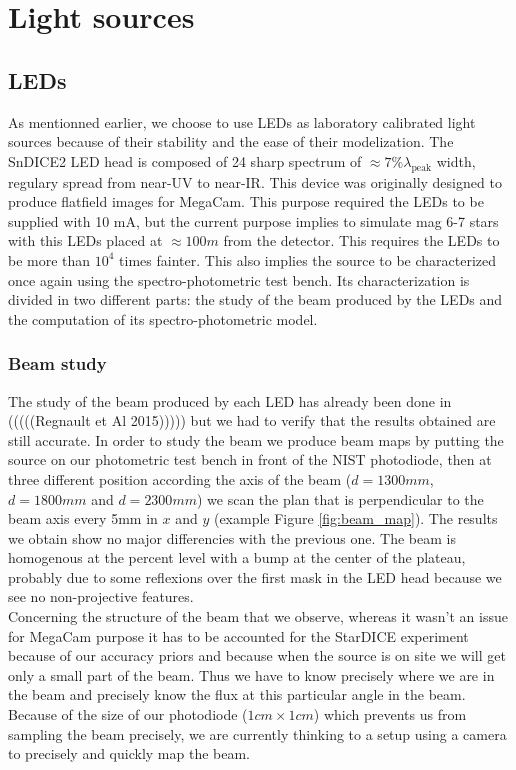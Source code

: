 \documentclass[\docopts]{\docclass}
\begin{document}

\section{Light sources}
\label{sec:sources}

\subsection{LEDs}
\label{sec:leds}
As mentionned earlier, we choose to use LEDs as laboratory calibrated
light sources because of their stability and the ease of their
modelization. The SnDICE2 LED head is composed of 24 sharp spectrum of
$\approx 7\% \lambda_\text{peak}$ width, regulary spread from near-UV to
near-IR. This device was originally designed to produce flatfield
images for MegaCam. This purpose required the LEDs to be supplied with
10 mA, but the current purpose implies to simulate mag 6-7 stars with
this LEDs placed at $\approx 100 m$ from the detector. This requires
the LEDs to be more than $10^4$ times fainter. This also implies the
source to be characterized once again using the spectro-photometric
test bench. Its characterization is divided in two different parts:
the study of the beam produced by the LEDs and the computation of its
spectro-photometric model.

\subsubsection{Beam study}
\label{sec:beam_study}
The study of the beam produced by each LED has already been done in
(((((Regnault et Al 2015)))))\cite{2015A&A...581A..45R,} but we had to
verify that the results obtained are still accurate. In order to study
the beam we produce beam maps by putting the source on our photometric
test bench in front of the NIST photodiode, then at three different
position according the axis of the beam ($d=1300mm$, $d=1800mm $ and
$d=2300mm$) we scan the plan that is perpendicular to the beam axis
every 5mm in $x$ and $y$ (example Figure \ref{fig:beam_map}). The
results we obtain show no major differencies with the previous
one. The beam is homogenous at the percent level with a bump at the
center of the plateau, probably due to some reflexions over the first
mask in the LED head because we see
no non-projective features. \\
Concerning the structure of the beam that we observe, whereas it
wasn't an issue for MegaCam purpose it has to be accounted for the
StarDICE experiment because of our accuracy priors and because when
the source is on site we will get only a small part of the beam. Thus
we have to know precisely where we are in the beam and precisely know
the flux at this particular angle in the beam. Because of the size of
our photodiode ($1cm \times 1cm$) which prevents us from sampling the
beam precisely, we are currently thinking to a setup using a camera to
precisely and quickly map the beam.
\end{document}

